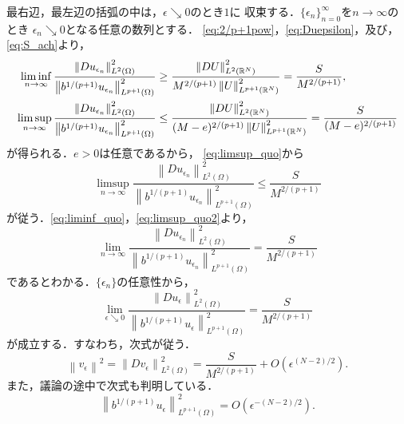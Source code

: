 最右辺，最左辺の括弧の中は，$\epsilon \searrow 0$のとき$1$に
収束する．$\{ \epsilon_n \}_{n=0}^\infty$を$n \to \infty$のとき
$\epsilon_n \searrow 0$となる任意の数列とする．
\eqref{eq:2/p+1pow}，\eqref{eq:Duepsilon}，及び，
\eqref{eq:S_ach}より，
\begin{align}
 \liminf_{n \to \infty} \frac{\left\| Du_{\epsilon_n}
 \right\|_{L^2(\Omega)}^2}{\left\| b^{1/(p+1)} u_{\epsilon_n}
 \right\|_{L^{p+1}(\Omega)}^2} &\geq 
 \frac{\left\| DU \right\|_{L^2(\mathbb{R}^N)}^2}
   {M^{2/(p+1)} \left\| U \right\|_{L^{p+1}(\mathbb{R}^N)}^2} 
 = \frac{S}{M^{2/(p+1)}}, \label{eq:liminf_quo} \\ 
 \limsup_{n \to \infty} \frac{\left\| Du_{\epsilon_n}
 \right\|_{L^2(\Omega)}^2}{\left\| b^{1/(p+1)} u_{\epsilon_n}
 \right\|_{L^{p+1}(\Omega)}^2} &\leq 
 \frac{\left\| DU \right\|_{L^2(\mathbb{R}^N)}^2}
   {(M-e)^{2/(p+1)} \left\| U \right\|_{L^{p+1}(\mathbb{R}^N)}^2} 
 = \frac{S}{(M-e)^{2/(p+1)}} \label{eq:limsup_quo}
\end{align}
が得られる．$e > 0$は任意であるから，
\eqref{eq:limsup_quo}から
\begin{equation}
 \limsup_{n \to \infty} \frac{\left\| Du_{\epsilon_n}
 \right\|_{L^2(\Omega)}^2}{\left\| b^{1/(p+1)} u_{\epsilon_n}
 \right\|_{L^{p+1}(\Omega)}^2} \leq 
 \frac{S}{M^{2/(p+1)}} \label{eq:limsup_quo2}
\end{equation}
が従う．\eqref{eq:liminf_quo}，\eqref{eq:limsup_quo2}より，
\[
 \lim_{n \to \infty} \frac{\left\| Du_{\epsilon_n}
 \right\|_{L^2(\Omega)}^2}{\left\| b^{1/(p+1)} u_{\epsilon_n}
 \right\|_{L^{p+1}(\Omega)}^2} =
 \frac{S}{M^{2/(p+1)}}
\]
であるとわかる．$\{ \epsilon_n \}$の任意性から，
\[
 \lim_{\epsilon \searrow 0} \frac{\left\| Du_{\epsilon}
 \right\|_{L^2(\Omega)}^2}{\left\| b^{1/(p+1)} u_{\epsilon}
 \right\|_{L^{p+1}(\Omega)}^2} =
 \frac{S}{M^{2/(p+1)}}
\]
が成立する．すなわち，次式が従う．
\begin{equation}
 \left\| v_\epsilon \right\|^2 = \left\| Dv_\epsilon
                                 \right\|^2_{L^2(\Omega)} 
 = \frac{S}{M^{2/(p+1)}} + O(\epsilon^{(N-2)/2}). \label{eq:vepsilon}
\end{equation}
また，議論の途中で次式も判明している．
\begin{equation}
 \left\| b^{1/(p+1)} u_\epsilon \right\|_{L^{p+1}(\Omega)}^2 = 
 O(\epsilon^{-(N-2)/2}). \label{eq:buepsilon}
\end{equation}

